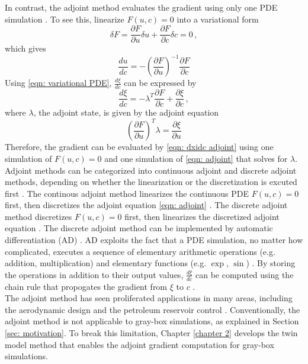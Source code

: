 In contrast, the adjoint method evaluates the gradient using only one PDE simulation
\cite{adjoint}.
To see this, linearize $F(u,c)=0$ into a variational form
\begin{equation}
    \delta F = \frac{\partial F}{\partial u} \delta u + \frac{\partial F}{\partial c} \delta c = 0\,,
\end{equation}
which gives
\begin{equation}
    \frac{du}{dc} = - \left(\frac{\partial F}{\partial u}\right)^{-1} \frac{\partial F}{\partial c}
    \label{eqn: variational PDE}
\end{equation}
Using \eqref{eqn: variational PDE}, $\frac{d\xi}{dc}$ can be expressed by
\begin{equation}
    \frac{d\xi}{dc} = - \lambda^T \frac{\partial F}{\partial c} + \frac{\partial \xi}{\partial c}\,,
    \label{eqn: dxidc adjoint}
\end{equation}
where $\lambda$, the adjoint state, is given by the adjoint equation
\begin{equation}
    \left(\frac{\partial F}{\partial u}\right)^T \lambda = \frac{\partial \xi}{\partial u}
    \label{eqn: adjoint}
\end{equation}
Therefore, the gradient can be evaluated by \eqref{eqn: dxidc adjoint}
using one simulation of $F(u,c)=0$ and one simulation of \eqref{eqn: adjoint} that 
solves for $\lambda$. \\

Adjoint methods can be categorized into continuous adjoint and discrete adjoint methods,
depending on whether the linearization or the discretization is excuted first \cite{review adjoint geo}.
The continous adjoint method linearizes the continuous PDE $F(u,c) = 0$ first,
then discretizes the adjoint equation \eqref{eqn: adjoint} \cite{adjoint}. The discrete adjoint method 
discretizes $F(u,c)=0$ first, then linearizes the discretized adjoint equation \cite{discrete adjoint}.
The discrete adjoint method can be implemented by automatic differentiation (AD) 
\cite{AD review}.
AD exploits the fact that a PDE simulation, no matter how complicated, executes a sequence
of elementary arithmetic operations (e.g. addition, multiplication) and elementary functions
(e.g. $\exp$, $\sin$) \cite{AD review}. By storing the operations in addition to their output values, 
$\frac{d\xi}{d c}$ can be computed using the chain rule that propogates the gradient 
from $\xi$ to $c$ \cite{AD review}. \\

The adjoint method has seen proliferated applications in many areas, including the aerodynamic design
\cite{adjoint aerodynamics} and the petroleum reservoir control
\cite{adjoint reservoir optimal control}. Conventionally, the adjoint method is not applicable
to gray-box simulations, as explained in Section \ref{sec: motivation}. 
To break this limitation, Chapter \ref{chapter 2} develops the twin model method
that enables the adjoint gradient computation for gray-box simulations.\\

